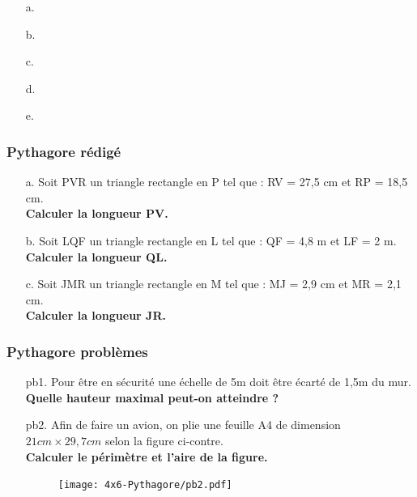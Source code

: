 \begin{multicols}{5}
  \begin{enumerate}
  \item[a.] \dotfill 
  \item[b.] \dotfill
  \item[c.] \dotfill 
  \item[d.] \dotfill 
  \item[e.] \dotfill 
  \end{enumerate}
\end{multicols}
\Pointilles[1]

\subsubsection*{Pythagore rédigé}

\begin{multicols}{3}
\begin{enumerate}
  \item[a.]Soit PVR un triangle rectangle en P tel que : RV = 27,5 cm et RP = 18,5 cm. \\
  \textbf{Calculer la longueur PV.}

  \item[b.]Soit LQF un triangle rectangle en L tel que : QF = 4,8 m et LF = 2 m. \\
  \textbf{Calculer la longueur QL.}

  \item[c.]Soit JMR un triangle rectangle en M tel que : MJ = 2,9 cm et MR = 2,1 cm. \\
  \textbf{Calculer la longueur JR.}
\end{enumerate}
\end{multicols}

\Pointilles[14]
\newpage

\subsubsection*{Pythagore problèmes}

\begin{multicols}{2}
\begin{enumerate}
  \item[pb1.] Pour être en sécurité une échelle de 5m doit être écarté de 1,5m du mur.\\
    \textbf{Quelle hauteur maximal peut-on atteindre ?}

  \item[pb2.] Afin de faire un avion, on plie une feuille A4 de dimension $21cm \times 29,7cm$ selon la figure ci-contre.\\
    \textbf{Calculer le périmètre et l'aire de la figure.}

  \begin{figure}[H]
    \centering
    \texttt{[image: 4x6-Pythagore/pb2.pdf]}
  \end{figure}
\end{enumerate}
\end{multicols}

